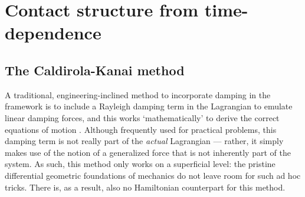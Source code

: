 \section{Contact structure from time-dependence}

\subsection{The Caldirola-Kanai method}
\label{ssec:caldirola}
A traditional, engineering-inclined method to incorporate damping in the framework is to include a Rayleigh damping term in the Lagrangian to emulate linear damping forces, and this works `mathematically' to derive the correct equations of motion \cite{Goldstein2011}. Although frequently used for practical problems, this damping term is not really part of the \emph{actual} Lagrangian --- rather, it simply makes use of the notion of a generalized force that is not inherently part of the system. As such, this method only works on a superficial level: the pristine differential geometric foundations of mechanics do not leave room for such ad hoc tricks. There is, as a result, also no Hamiltonian counterpart for this method. 

